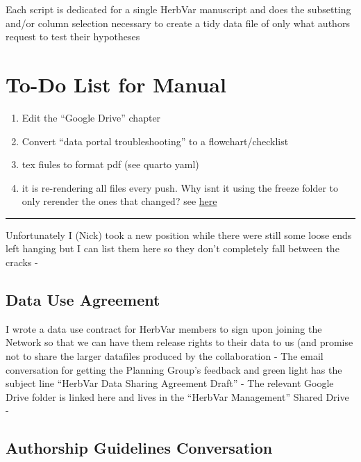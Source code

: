 \documentclass[
  letterpaper,
  oneside,
  open=any]{scrbook}
\providecommand{\tightlist}{%
  \setlength{\itemsep}{0pt}\setlength{\parskip}{0pt}}\usepackage{longtable,booktabs,array}
\begin{document}
Each script is dedicated for a single HerbVar manuscript and does the
subsetting and/or column selection necessary to create a tidy data file
of only what authors request to test their hypotheses

\chapter{To-Do List for Manual}\label{to-do-list-for-manual}

\begin{enumerate}
\def\labelenumi{\arabic{enumi}.}
\tightlist
\item
  Edit the ``Google Drive'' chapter
\item
  Convert ``data portal troubleshooting'' to a flowchart/checklist
\item
  tex fiules to format pdf (see quarto yaml)
\item
  it is re-rendering all files every push. Why isnt it using the freeze
  folder to only rerender the ones that changed? see
  \href{https://github.com/quarto-dev/quarto-cli/issues/3628}{here}
\end{enumerate}

\begin{center}\rule{0.5\linewidth}{0.5pt}\end{center}

Unfortunately I (Nick) took a new position while there were still some
loose ends left hanging but I can list them here so they don't
completely fall between the cracks -

\section{Data Use Agreement}\label{data-use-agreement}

I wrote a data use contract for HerbVar members to sign upon joining the
Network so that we can have them release rights to their data to us (and
promise not to share the larger datafiles produced by the collaboration
- The email conversation for getting the Planning Group's feedback and
green light has the subject line ``HerbVar Data Sharing Agreement
Draft'' - The relevant Google Drive folder is linked here and lives in
the ``HerbVar Management'' Shared Drive -

\section{Authorship Guidelines
Conversation}\label{authorship-guidelines-conversation}
\end{document}
